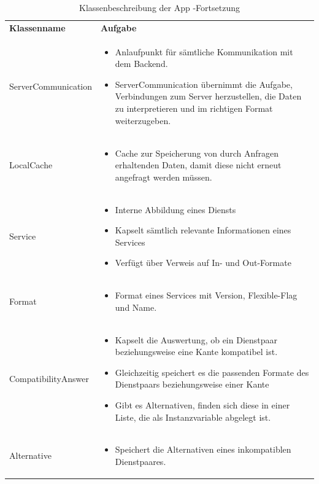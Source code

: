 \begin{table}
	\begin{tabularx}{\textwidth}{p{} | X}
\rowcolor[HTML]{C0C0C0}
		\textbf{Klassenname} & \textbf{Aufgabe} \\
		ServerCommunication & \begin{itemize} \item Anlaufpunkt für sämtliche Kommunikation mit dem Backend. 
\item ServerCommunication übernimmt die Aufgabe, Verbindungen zum Server herzustellen, die Daten zu interpretieren und im richtigen Format weiterzugeben. \end{itemize}\\
			\rowcolor[HTML]{E7E7E7} 		
		LocalCache & \begin{itemize} 
		\item Cache zur Speicherung von durch Anfragen erhaltenden Daten, damit diese nicht erneut angefragt werden müssen. 
		\end{itemize}\\
Service & \begin{itemize} \item Interne Abbildung eines Diensts
\item Kapselt sämtlich relevante Informationen eines Services
\item Verfügt über Verweis auf In- und Out-Formate
\end{itemize}\\
\rowcolor[HTML]{E7E7E7} 
Format & \begin{itemize}	\item Format eines Services mit Version, Flexible-Flag und Name.
		\end{itemize}\\
CompatibilityAnswer & \begin{itemize}
\item Kapselt die Auswertung, ob ein Dienstpaar beziehungsweise eine Kante kompatibel ist. 
\item Gleichzeitig speichert es die passenden Formate des Dienstpaars beziehungsweise einer Kante
\item Gibt es Alternativen, finden sich diese in einer Liste, die als Instanzvariable abgelegt ist.
\end{itemize}\\		
\rowcolor[HTML]{E7E7E7} 		
Alternative & \begin{itemize}
\item Speichert die Alternativen eines inkompatiblen Dienstpaares.
\end{itemize}\\		
	\end{tabularx}
	\caption{Klassenbeschreibung der App -Fortsetzung}
	\label{table:klassenbeschreibung-a}
\end{table}

